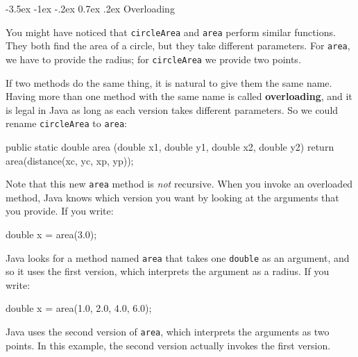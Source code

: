 \documentclass[12pt]{book}
\makeatletter
\theoremstyle{exercise}
\newcommand{\java}[1]{\verb"#1"}
\renewcommand{\section}{\@startsection{section}{1}{\z@}%
    {-3.5ex \@plus -1ex \@minus -.2ex}%
    {0.7ex \@plus.2ex}%
    {\normalfont\Large\bfseries}}
\newcommand{\java}[1]{\lstinline{#1}} %
\makeatother
\begin{document}



\section{Overloading}
\label{overloading}

You might have noticed that \java{circleArea} and \java{area} perform similar functions.
They both find the area of a circle, but they take different parameters.
For \java{area}, we have to provide the radius; for \java{circleArea} we provide two points.


If two methods do the same thing, it is natural to give them the same name.
Having more than one method with the same name is called {\bf overloading}, and it is legal in Java as long as each version takes different parameters.
So we could rename \java{circleArea} to \java{area}:

\begin{code}
    public static double area
            (double x1, double y1, double x2, double y2) {
        return area(distance(xc, yc, xp, yp));
    }
\end{code}

Note that this new \java{area} method is {\em not} recursive.
When you invoke an overloaded method, Java knows which version you want by looking at the arguments that you provide.
If you write:

\begin{code}
    double x = area(3.0);
\end{code}

Java looks for a method named \java{area} that takes one \java{double} as an argument, and so it uses the first version, which interprets the argument as a radius.
If you write:

\begin{code}
    double x = area(1.0, 2.0, 4.0, 6.0);
\end{code}

Java uses the second version of \java{area}, which interprets the arguments as two points.
In this example, the second version actually invokes the first version.
\end{document}
